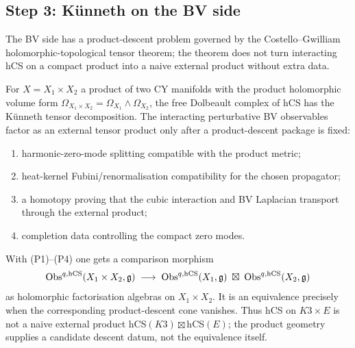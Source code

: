 \subsection*{Step 3: K\"unneth on the BV side}
\label{sec:agent06-step3-bv-kunneth}

The BV side has a product-descent problem governed by the
Costello--Gwilliam holomorphic-topological tensor theorem; the theorem
does not turn interacting hCS on a compact product into a naive
external product without extra data.

\begin{lemma}
\label{lem:agent06-bv-kunneth}
For $X = X_1 \times X_2$ a product of two CY manifolds with the
product holomorphic volume form $\Omega_{X_1
\times X_2} = \Omega_{X_1} \wedge \Omega_{X_2}$, the free Dolbeault
complex of hCS has the K\"unneth tensor decomposition. The interacting
perturbative BV observables factor as an external tensor product only
after a product-descent package is fixed:
\begin{enumerate}[label=\textup{(P\arabic*)}]
\item harmonic-zero-mode splitting compatible with the product metric;
\item heat-kernel Fubini/renormalisation compatibility for the chosen
propagator;
\item a homotopy proving that the cubic interaction and BV Laplacian
transport through the external product;
\item completion data controlling the compact zero modes.
\end{enumerate}
With \textup{(P1)--(P4)} one gets a comparison morphism
\begin{equation}
\label{eq:agent06-bv-kunneth-product}
 \mathrm{Obs}^{q,\mathrm{hCS}}(X_1 \times X_2, \mathfrak g) \;\longrightarrow\;
 \mathrm{Obs}^{q,\mathrm{hCS}}(X_1, \mathfrak g) \;\boxtimes\; \mathrm{Obs}^{q,\mathrm{hCS}}(X_2, \mathfrak g)
\end{equation}
as holomorphic factorisation algebras on $X_1 \times X_2$. It is an
equivalence precisely when the corresponding product-descent cone
vanishes. Thus hCS on $K3\times E$ is not a naive external product
hCS$(K3)\boxtimes$hCS$(E)$; the product geometry supplies a candidate
descent datum, not the equivalence itself.
\end{lemma}

